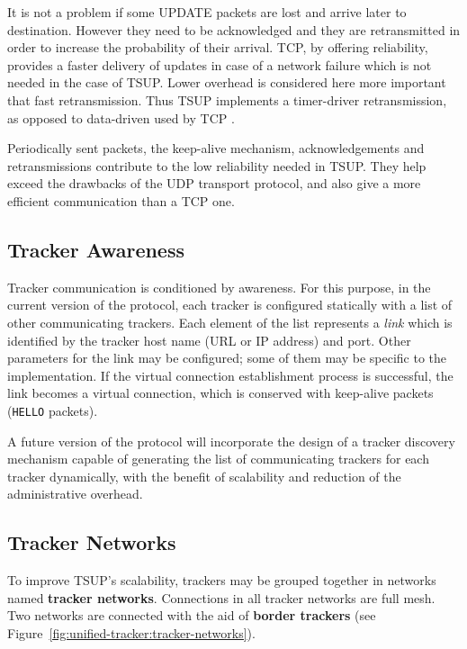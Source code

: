 It is not a problem if some UPDATE packets are lost and arrive later to
destination. However they need to be acknowledged and they are retransmitted
in order to increase the probability of their arrival. TCP, by offering
reliability, provides a faster delivery of updates in case of a network
failure which is not needed in the case of TSUP. Lower overhead is considered
here more important that fast retransmission. Thus TSUP implements a
timer-driver retransmission, as opposed to data-driven used by TCP
\cite{reliable-transport}.

Periodically sent packets, the keep-alive mechanism, acknowledgements and
retransmissions contribute to the low reliability needed in TSUP. They help
exceed the drawbacks of the UDP transport protocol, and also
give a more efficient communication than a TCP one.

\subsection{Tracker Awareness}
\label{subsec:unified-tracker:tracker-awareness}

Tracker communication is conditioned by awareness. For this purpose, in the
current version of the protocol, each tracker is configured statically with a
list of other communicating trackers. Each element of the list represents a
\textit{link} which is identified by the tracker host name (URL or IP address)
and port. Other parameters for the link may be configured; some of them may be
specific to the implementation. If the virtual connection establishment
process is successful, the link becomes a virtual connection, which is
conserved with keep-alive packets (\texttt{HELLO} packets).

A future version of the protocol will incorporate the design of a tracker
discovery mechanism capable of generating the list of communicating trackers
for each tracker dynamically, with the benefit of scalability and reduction of
the administrative overhead.

\subsection{Tracker Networks}
\label{subsec:unified-tracker:tracker-networks}

To improve TSUP's scalability, trackers may be grouped together in networks
named \textbf{tracker networks}. Connections in all tracker networks are full
mesh. Two networks are connected with the aid of \textbf{border trackers} (see
Figure~\ref{fig:unified-tracker:tracker-networks}).

